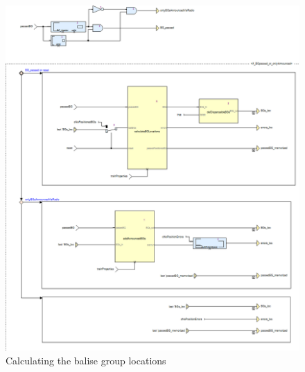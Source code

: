\begin{figure}[!htb]
\centering
\includegraphics[scale=0.5]{../images/calculateTrainPosition_calcBGs.png}
\caption{Calculating the balise group locations}
\end{figure}
\clearpage

